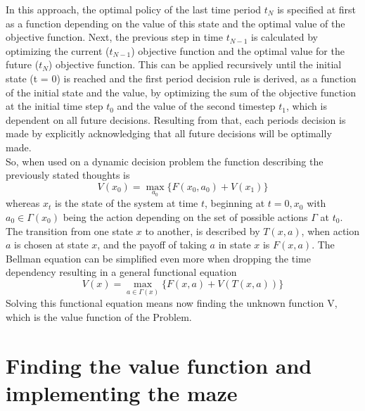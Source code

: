 \documentclass[conference]{IEEEtran}
\begin{document}
In this approach, the optimal policy of the last time period $t_N$ is specified at first as a function depending on the value of this state and the optimal value of the objective function.
Next, the previous step in time $t_{N-1}$ is calculated by optimizing the current ($t_{N-1}$) objective function and the optimal value for the future ($t_{N}$) objective function. This can be applied recursively until the initial state (t = 0) is reached and the first period decision rule is derived, as a function of the initial state and the value, by optimizing the sum of the objective function at the initial time step $t_{0}$ and the value of the second timestep $t_{1}$, which is dependent on all future decisions. Resulting from that, each periods decision is made by explicitly acknowledging that all future decisions will be optimally made.\\
So, when used on a dynamic decision problem the function describing the previously stated thoughts is
\begin{equation}
V(x_0) = \max_{a_0} \{F(x_0, a_0) + V(x_1)\}
\end{equation}
whereas $x_t$ is the state of the system at time $t$, beginning at $t = 0, x_0$ with
$a_0 \in \Gamma(x_0)$ being the action depending on the set of possible actions $\Gamma$ at $t_0$.
The transition from one state $x$ to another, is described by $T(x,a)$, when action $a$ is chosen at state $x$, and the payoff of taking $a$ in state $x$ is $F(x,a)$.
The Bellman equation can be simplified even more when dropping the time dependency resulting in a general functional equation
\begin{equation}
V(x) = \max_{a \in \Gamma(x)} \{F(x,a) + V(T(x,a))\}
\end{equation}
Solving this functional equation means now finding the unknown function V, which is the value function of the Problem.\\

\section{Finding the value function and implementing the maze}
\end{document}
